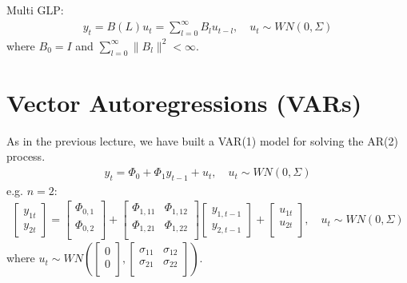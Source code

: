 Multi GLP:
\begin{gather*}
    y_t = B(L) u_t = \sum_{l=0}^{\infty} B_l u_{t-l}, \quad u_t \sim WN(0, \Sigma)
\end{gather*}
where $B_0 = I$ and $\sum_{l=0}^{\infty} \lVert B_l \rVert^2 < \infty.$

\section{Vector Autoregressions (VARs)}\label{sec:var}

As in the previous lecture, we have built a VAR(1) model for solving the AR(2) process.
\begin{gather*}
    y_t = \Phi_0 + \Phi_1 y_{t-1} + u_t, \quad u_t \sim WN(0, \Sigma)
\end{gather*}
e.g. $n=2$:
\begin{gather*}
    \begin{bmatrix}
        y_{1t} \\
        y_{2t}
    \end{bmatrix} = \begin{bmatrix}
         \Phi_{0,1} \\
         \Phi_{0,2} \\
    \end{bmatrix} + \begin{bmatrix}
        \Phi_{1,11} & \Phi_{1,12}  \\
        \Phi_{1,21} & \Phi_{1,22}  \\
    \end{bmatrix}
    \begin{bmatrix}
        y_{1,t-1} \\
        y_{2,t-1}
    \end{bmatrix} + \begin{bmatrix}
         u_{1t} \\
         u_{2t} \\
    \end{bmatrix}, \quad u_t \sim WN(0, \Sigma)
\end{gather*}
where $u_t \sim  WN\left( \begin{bmatrix}
     0 \\
     0 \\
\end{bmatrix}, \begin{bmatrix}
    \sigma_{11} & \sigma_{12} \\
    \sigma_{21} & \sigma_{22} \\
\end{bmatrix} \right)$.

